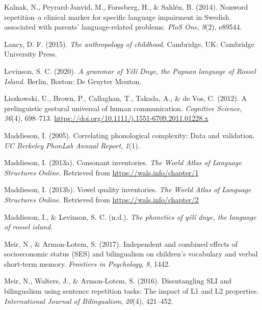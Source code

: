 \documentclass[english,,man,floatsintext]{apa6}
\begin{document}
\leavevmode\hypertarget{ref-kalnak2014nonword}{}%
Kalnak, N., Peyrard-Janvid, M., Forssberg, H., \& Sahlén, B. (2014). Nonword repetition--a clinical marker for specific language impairment in Swedish associated with parents' language-related problems. \emph{PloS One}, \emph{9}(2), e89544.

\leavevmode\hypertarget{ref-lancy2015anthropology}{}%
Lancy, D. F. (2015). \emph{The anthropology of childhood}. Cambridge, UK: Cambridge University Press.

\leavevmode\hypertarget{ref-levinsonYDgrammar}{}%
Levinson, S. C. (2020). \emph{A grammar of Yélî Dnye, the Papuan language of Rossel Island}. Berlin, Boston: De Gruyter Mouton.

\leavevmode\hypertarget{ref-liszkowski2012prelinguistic}{}%
Liszkowski, U., Brown, P., Callaghan, T., Takada, A., \& de Vos, C. (2012). A prelinguistic gestural universal of human communication. \emph{Cognitive Science}, \emph{36}(4), 698--713. \url{https://doi.org/10.1111/j.1551-6709.2011.01228.x}

\leavevmode\hypertarget{ref-maddieson2005correlating}{}%
Maddieson, I. (2005). Correlating phonological complexity: Data and validation. \emph{UC Berkeley PhonLab Annual Report}, \emph{1}(1).

\leavevmode\hypertarget{ref-maddieson2013consonant}{}%
Maddieson, I. (2013a). Consonant inventories. \emph{The World Atlas of Language Structures Online}. Retrieved from \url{https://wals.info/chapter/1}

\leavevmode\hypertarget{ref-maddieson2013vowel}{}%
Maddieson, I. (2013b). Vowel quality inventories. \emph{The World Atlas of Language Structures Online}. Retrieved from \url{https://wals.info/chapter/2}

\leavevmode\hypertarget{ref-maddiesonIPphoneticsYD}{}%
Maddieson, I., \& Levinson, S. C. (n.d.). \emph{The phonetics of yélî dnye, the language of rossel island}.

\leavevmode\hypertarget{ref-meir2017independent}{}%
Meir, N., \& Armon-Lotem, S. (2017). Independent and combined effects of socioeconomic status (SES) and bilingualism on children's vocabulary and verbal short-term memory. \emph{Frontiers in Psychology}, \emph{8}, 1442.

\leavevmode\hypertarget{ref-meir2016disentangling}{}%
Meir, N., Walters, J., \& Armon-Lotem, S. (2016). Disentangling SLI and bilingualism using sentence repetition tasks: The impact of L1 and L2 properties. \emph{International Journal of Bilingualism}, \emph{20}(4), 421--452.
\end{document}
